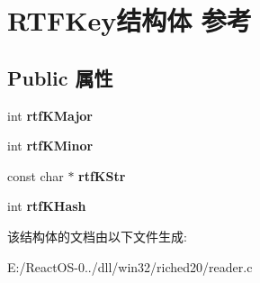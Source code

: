 \hypertarget{struct_r_t_f_key}{}\section{R\+T\+F\+Key结构体 参考}
\label{struct_r_t_f_key}
\subsection*{Public 属性}
\begin{DoxyCompactItemize}
\item 
\mbox{\label{struct_r_t_f_key_a0f6df26246ff4de85f13f48cfc43dc7c}} 
int {\bfseries rtf\+K\+Major}
\item 
\mbox{\label{struct_r_t_f_key_a5afe5463ed7a73320097f7f65f37a18f}} 
int {\bfseries rtf\+K\+Minor}
\item 
\mbox{\label{struct_r_t_f_key_a271b05ce38224bc03c1bf5a71cf294e3}} 
const char $\ast$ {\bfseries rtf\+K\+Str}
\item 
\mbox{\label{struct_r_t_f_key_ad2022d80b080aa07ca831c33b777b6c1}} 
int {\bfseries rtf\+K\+Hash}
\end{DoxyCompactItemize}


该结构体的文档由以下文件生成\+:\begin{DoxyCompactItemize}
\item 
E\+:/\+React\+O\+S-\/0../dll/win32/riched20/reader.\+c\end{DoxyCompactItemize}
